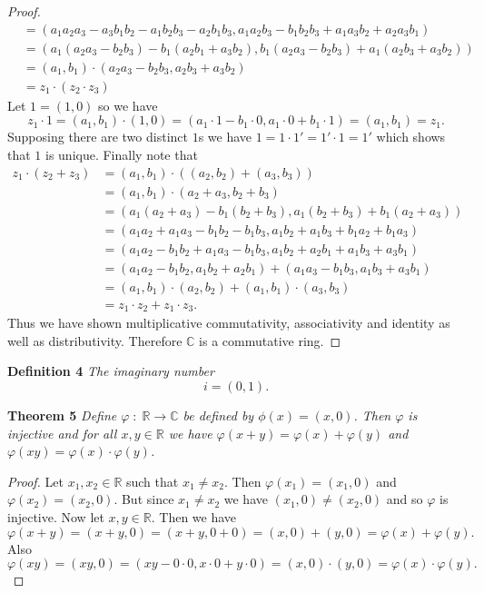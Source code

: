 \documentclass{article}
\begin{document}
\begin{flushleft}
\begin{proof}
\begin{align*}
	&= (a_1a_2a_3 - a_3b_1b_2 - a_1b_2b_3 - a_2b_1b_3, a_1a_2b_3 - b_1b_2b_3 + a_1a_3b_2 + a_2a_3b_1) \\
	&= (a_1(a_2a_3 - b_2b_3) - b_1(a_2b_1 + a_3b_2), b_1(a_2a_3 - b_2b_3) + a_1(a_2b_3 + a_3b_2)) \\
	&= (a_1, b_1) \cdot (a_2a_3 - b_2b_3, a_2b_3 + a_3b_2) \\
	&= z_1 \cdot (z_2 \cdot z_3)
\end{align*}
Let $1 = (1,0)$ so we have
\[
z_1 \cdot 1 = (a_1, b_1) \cdot (1, 0) = (a_1 \cdot 1 - b_1 \cdot 0, a_1 \cdot 0 + b_1 \cdot 1) = (a_1, b_1) = z_1.
\]
Supposing there are two distinct $1$s we have $1 = 1 \cdot 1' = 1' \cdot 1 = 1'$ which shows that $1$ is unique. Finally note that
\begin{align*}
z_1 \cdot (z_2 + z_3) &= (a_1, b_1) \cdot ((a_2, b_2) + (a_3, b_3)) \\
	&= (a_1, b_1) \cdot (a_2 + a_3, b_2 + b_3) \\
	&= (a_1(a_2 + a_3) - b_1(b_2 + b_3), a_1(b_2 + b_3) + b_1(a_2 + a_3)) \\
	&= (a_1a_2 + a_1a_3 - b_1b_2 - b_1b_3, a_1b_2 + a_1b_3 + b_1a_2 + b_1a_3) \\
	&= (a_1a_2 - b_1b_2 + a_1a_3 - b_1b_3, a_1b_2 + a_2b_1 + a_1b_3 + a_3b_1) \\
	&= (a_1a_2 - b_1b_2, a_1b_2 + a_2b_1) + (a_1a_3 - b_1b_3, a_1b_3 + a_3b_1) \\
	&= (a_1, b_1) \cdot (a_2, b_2) + (a_1, b_1) \cdot (a_3, b_3) \\
	&= z_1 \cdot z_2 + z_1 \cdot z_3.
\end{align*}
Thus we have shown multiplicative commutativity, associativity and identity as well as distributivity. Therefore $\mathbb{C}$ is a commutative ring.
\end{proof}

\textbf{Definition 4}
\textsl{The imaginary number
\[
i = (0,1).
\]}\newline

\textbf{Theorem 5}
\textsl{Define $\varphi \; : \; \mathbb{R} \rightarrow \mathbb{C}$ be defined by $\phi (x) = (x,0)$. Then $\varphi$ is injective and for all $x,y \in \mathbb{R}$ we have $\varphi (x+y) = \varphi (x) + \varphi (y)$ and $\varphi (xy) = \varphi(x) \cdot \varphi (y)$.}
\begin{proof}
Let $x_1, x_2 \in \mathbb{R}$ such that $x_1 \neq x_2$. Then $\varphi (x_1) = (x_1, 0)$ and $\varphi (x_2) = (x_2, 0)$. But since $x_1 \neq x_2$ we have $(x_1, 0) \neq (x_2, 0)$ and so $\varphi$ is injective. Now let $x,y \in \mathbb{R}$. Then we have
\[
\varphi (x+y) = (x+y,0) = (x+y,0+0) = (x,0) + (y,0) = \varphi (x) + \varphi (y).
\]
Also
\[
\varphi (xy) = (xy,0) = (xy - 0 \cdot 0, x \cdot 0 + y \cdot 0) = (x,0) \cdot (y,0) = \varphi (x) \cdot \varphi (y).
\]
\end{proof}


\end{flushleft}
\end{document}
